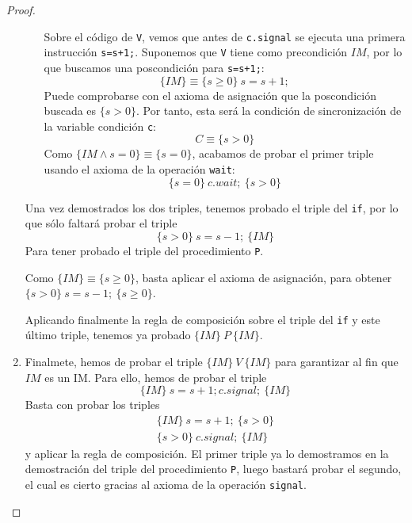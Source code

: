 \begin{ejemplo}
\begin{proof}
\begin{enumerate}
\begin{enumerate}
                        Sobre el código de \verb|V|, vemos que antes de \verb|c.signal| se ejecuta una primera instrucción \verb|s=s+1;|. Suponemos que \verb|V| tiene como precondición $IM$, por lo que buscamos una poscondición para \verb|s=s+1;|:
                        \begin{equation*}
                            \{IM\}\equiv \{s\geq 0\}\ s=s+1;
                        \end{equation*}
                        Puede comprobarse con el axioma de asignación que la poscondición buscada es $\{s>0\}$. Por tanto, esta será la condición de sincronización de la variable condición \verb|c|:
                        \begin{equation*}
                            C \equiv \{s>0\}
                        \end{equation*}
                        Como $\{IM \land s=0\}\equiv \{s=0\}$, acabamos de probar el primer triple usando el axioma de la operación \verb|wait|:
                        \begin{equation*}
                            \{s=0\}\ c.wait;\ \{s>0\}
                        \end{equation*}
                \end{enumerate}
                Una vez demostrados los dos triples, tenemos probado el triple del \verb|if|, por lo que sólo faltará probar el triple 
                \begin{equation*}
                    \{s>0\}\ s=s-1;\ \{IM\}
                \end{equation*}
                Para tener probado el triple del procedimiento \verb|P|.

                Como $\{IM\} \equiv \{s\geq 0\}$, basta aplicar el axioma de asignación, para obtener $\{s>0\}\ s=s-1;\ \{s\geq 0\}$.

                Aplicando finalmente la regla de composición sobre el triple del \verb|if| y este último triple, tenemos ya probado $\{IM\}\ P\ \{IM\}$.

            \item Finalmete, hemos de probar el triple $\{IM\}\ V\ \{IM\}$ para garantizar al fin que $IM$ es un IM\@. Para ello, hemos de probar el triple
                \begin{equation*}
                    \{IM\}\ s=s+1; c.signal;\ \{IM\}
                \end{equation*}
                Basta con probar los triples
                \begin{gather*}
                    \{IM\}\ s=s+1;\ \{s>0\} \\
                    \{s>0\}\ c.signal;\ \{IM\}
                \end{gather*}
                y aplicar la regla de composición. El primer triple ya lo demostramos en la demostración del triple del procedimiento \verb|P|, luego bastará probar el segundo, el cual es cierto gracias al axioma de la operación \verb|signal|.


\end{enumerate}
\end{proof}
\end{ejemplo}
